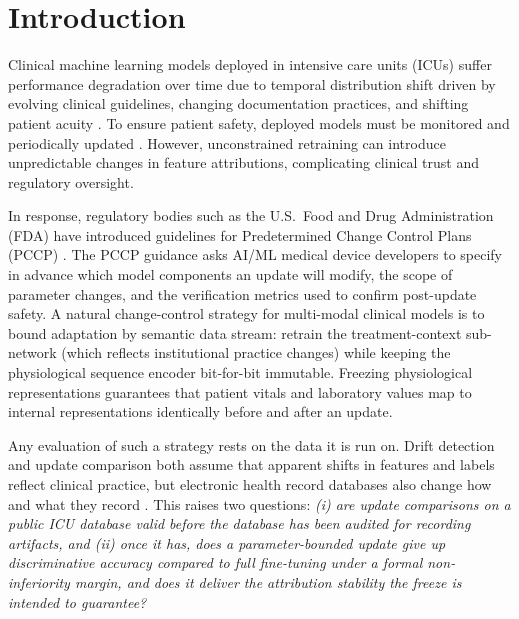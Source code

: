 \documentclass[10pt,a4paper,twocolumn]{article}
\begin{document}
	\section{Introduction}
	Clinical machine learning models deployed in intensive care units (ICUs) suffer performance degradation over time due to temporal distribution shift driven by evolving clinical guidelines, changing documentation practices, and shifting patient acuity \citep{davis2017calibration,nestor2019feature,guo2022evaluation,finlayson2021clinician}. To ensure patient safety, deployed models must be monitored and periodically updated \citep{jenkins2021continual,feng2022clinical}. However, unconstrained retraining can introduce unpredictable changes in feature attributions, complicating clinical trust and regulatory oversight.
	
	In response, regulatory bodies such as the U.S.\ Food and Drug Administration (FDA) have introduced guidelines for Predetermined Change Control Plans (PCCP) \citep{fda2024pccp}. The PCCP guidance asks AI/ML medical device developers to specify in advance which model components an update will modify, the scope of parameter changes, and the verification metrics used to confirm post-update safety. A natural change-control strategy for multi-modal clinical models is to bound adaptation by semantic data stream: retrain the treatment-context sub-network (which reflects institutional practice changes) while keeping the physiological sequence encoder bit-for-bit immutable. Freezing physiological representations guarantees that patient vitals and laboratory values map to internal representations identically before and after an update.
	
	Any evaluation of such a strategy rests on the data it is run on. Drift detection and update comparison both assume that apparent shifts in features and labels reflect clinical practice, but electronic health record databases also change how and what they record \citep{agniel2018biases,weiskopf2013methods}. This raises two questions: \emph{(i) are update comparisons on a public ICU database valid before the database has been audited for recording artifacts, and (ii) once it has, does a parameter-bounded update give up discriminative accuracy compared to full fine-tuning under a formal non-inferiority margin, and does it deliver the attribution stability the freeze is intended to guarantee?}
	
\end{document}
